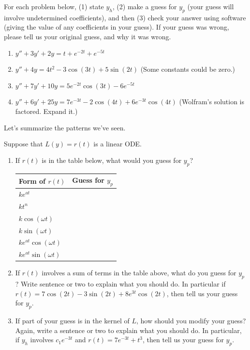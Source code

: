 \begin{problem}
 For each problem below, (1) state $y_h$, (2) make a guess for $y_p$ (your guess will involve undetermined coefficients), and then (3) check your answer using software (giving the value of any coefficients in your guess). If your guess was wrong, please tell us your original guess, and why it was wrong. 
\begin{enumerate}
 \item $y''+3y'+2y=t+e^{-2t}+e^{-5t}$
 \item $y''+4y = 4t^2-3\cos(3t)+5\sin(2t)$ (Some constants could be zero.)
 \item $y''+7y'+10y= 5e^{-2t}\cos(3t) -6e^{-5t}$
 \item $y''+6y'+25y = 7e^{-3t}-2\cos(4t) +6e^{-3t}\cos(4t)$ (Wolfram's solution is factored.  Expand it.)
\end{enumerate}
\end{problem}

Let's summarize the patterns we've seen. 
\begin{problem}
 Suppose that $L(y)=r(t)$ is a linear ODE. 
\begin{enumerate}
 \item If $r(t)$ is in the table below, what would you guess for $y_p$?
\begin{center}
\begin{tabular}{|l|l|}
\hline
Form of $r(t)$ & Guess for $y_p$\quad\quad\quad\quad\quad\quad\quad\quad\quad\quad\quad\quad\quad\quad\quad\\\hline\hline
$ke^{at}$ & \\\hline
$kt^n$ & \\\hline
$k\cos(\omega t)$ & \\\hline
$k\sin(\omega t)$ & \\\hline
$ke^{at}\cos(\omega t)$& \\\hline
$ke^{at}\sin(\omega t)$ & \\\hline
\end{tabular}
\end{center}
\item If $r(t)$ involves a sum of terms in the table above, what do you guess for $y_p$? 
Write sentence or two to explain what you should do. In particular if $r(t) = 7\cos(2t)-3\sin(2t)+8e^{3t}\cos(2t)$, then tell us your guess for $y_p$.
\item If part of your guess is in the kernel of $L$, how should you modify your guess?  
Again, write a sentence or two to explain what you should do. In particular, if $y_h$ involves $c_1e^{-3t}$ and $r(t)=7e^{-3t}+t^3$, then tell us your guess for $y_p$.
\end{enumerate}
\end{problem}

